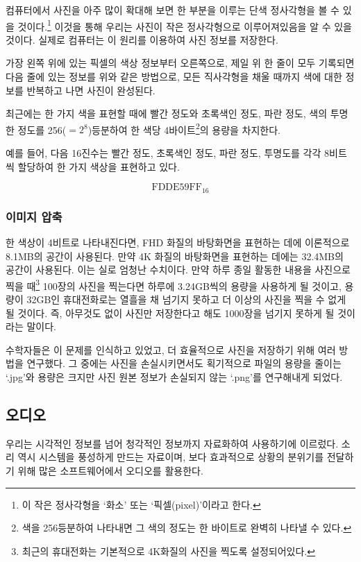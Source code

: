 \documentclass{article}
\begin{document}
컴퓨터에서 사진을 아주 많이 확대해 보면 한 부분을 이루는 단색 정사각형을 볼 수 있을
것이다.\footnote{이 작은 정사각형을 `화소' 또는 `픽셀(pixel)'이라고 한다.}
이것을 통해 우리는 사진이 작은 정사각형으로 이루어져있음을 알 수 있을 것이다.
실제로 컴퓨터는 이 원리를 이용하여 사진 정보를 저장한다.

가장 왼쪽 위에 있는 픽셀의 색상 정보부터 오른쪽으로,
제일 위 한 줄이 모두 기록되면 다음 줄에 있는 정보를 위와 같은 방법으로,
모든 직사각형을 채울 때까지 색에 대한 정보를 반복하고 나면 사진이 완성된다.

최근에는 한 가지 색을 표현할 때에 빨간 정도와 초록색인 정도, 파란 정도, 색의 투명한 정도를
256($=2^8$)등분하여 한 색당 4바이트\footnote{색을 256등분하여 나타내면 그 색의 정도는 한
바이트로 완벽히 나타낼 수 있다.}의 용량을 차지한다.

예를 들어, 다음 16진수는 빨간 정도, 초록색인 정도, 파란 정도, 투명도를 각각 8비트씩 할당하여
한 가지 색상을 표현하고 있다.

$$
\text{FDDE59FF}_{16}
$$

\subsubsection{이미지 압축}

한 색상이 4비트로 나타내진다면, FHD 화질의 바탕화면을 표현하는 데에 이론적으로 8.1MB의 공간이
사용된다. 만약 4K 화질의 바탕화면을 표현하는 데에는 32.4MB의 공간이 사용된다.
이는 실로 엄청난 수치이다. 만약 하루 종일 활동한 내용을 사진으로 찍을 때\footnote{최근의
휴대전화는 기본적으로 4K화질의 사진을 찍도록 설정되어있다.} 100장의 사진을 찍는다면
하루에 3.24GB씩의 용량을 사용하게 될 것이고, 용량이 32GB인 휴대전화로는 열흘을 채 넘기지 못하고
더 이상의 사진을 찍을 수 없게 될 것이다. 즉, 아무것도 없이 사진만 저장한다고 해도 1000장을
넘기지 못하게 될 것이라는 말이다.

수학자들은 이 문제를 인식하고 있었고, 더 효율적으로 사진을 저장하기 위해 여러 방법을 연구했다.
그 중에는 사진을 손실시키면서도 획기적으로 파일의 용량을 줄이는 `.jpg'와 용량은 크지만 사진 원본
정보가 손실되지 않는 `.png'를 연구해내게 되었다.

\subsection{오디오}

우리는 시각적인 정보를 넘어 청각적인 정보까지 자료화하여 사용하기에 이르렀다.
소리 역시 시스템을 풍성하게
만드는 자료이며, 보다 효과적으로 상황의 분위기를 전달하기 위해 많은 소프트웨어에서 오디오를 활용한다.
\end{document}
